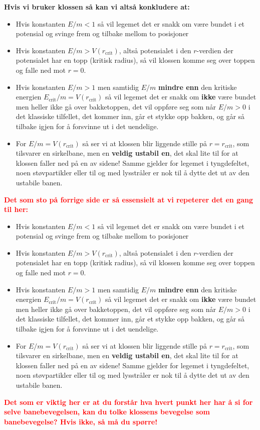 \documentclass{beamer}
\newcommand{\pagebutton}[1]{\setbeamertemplate{button}{\tikz\node[inner xsep = 5pt, draw = structure!90, fill = green(ryb), rounded corners = 8pt]{\color{amber}\Large\insertbuttontext};}\beamerbutton{#1}}
\begin{document}
\begin{frame}
{
{\bf Hvis vi bruker klossen så kan vi altså konkludere at:}
\begin{itemize}
\item Hvis konstanten $E/m<1$ så vil legemet det er snakk om være bundet i et potensial og svinge frem og tilbake mellom to posisjoner
\item Hvis konstanten $E/m>V(r_\mathrm{crit})$, altså potensialet i den $r$-verdien der potensialet har en topp (kritisk radius), så vil klossen komme seg over toppen og falle ned mot $r=0$.
\item Hvis konstanten $E/m>1$ men samtidig $E/m$ {\bf mindre enn} den kritiske energien $E_\mathrm{crit}/m=V(r_\mathrm{crit})$ så vil legemet det er snakk om {\bf ikke} være bundet men heller ikke gå over bakketoppen, det vil oppføre seg som når $E/m>0$ i det klassiske tilfellet, det kommer inn, går et stykke opp bakken, og går så tilbake igjen for å forsvinne ut i det uendelige.
\item For $E/m=V(r_\mathrm{crit})$ så ser vi at klossen blir liggende stille på $r=r_\mathrm{crit}$, som tilsvarer en sirkelbane, men en {\bf veldig ustabil en}, det skal lite til for at klossen faller ned på en av sidene! Samme gjelder for legemet i tyngdefeltet, noen støvpartikler eller til og med lysstråler er nok til å dytte det ut av den ustabile banen.
\end{itemize}
\hyperlink{skra24}{\pagebutton{SIDE 56/70/84}}}


{
\textcolor{red}{\bf\large Det som sto på forrige side er så essensielt at vi repeterer det en gang til her:}
\begin{itemize}
\item Hvis konstanten $E/m<1$ så vil legemet det er snakk om være bundet i et potensial og svinge frem og tilbake mellom to posisjoner
\item Hvis konstanten $E/m>V(r_\mathrm{crit})$, altså potensialet i den $r$-verdien der potensialet har en topp (kritisk radius), så vil klossen komme seg over toppen og falle ned mot $r=0$.
\item Hvis konstanten $E/m>1$ men samtidig $E/m$ {\bf mindre enn} den kritiske energien $E_\mathrm{crit}/m=V(r_\mathrm{crit})$ så vil legemet det er snakk om {\bf ikke} være bundet men heller ikke gå over bakketoppen, det vil oppføre seg som når $E/m>0$ i det klassiske tilfellet, det kommer inn, går et stykke opp bakken, og går så tilbake igjen for å forsvinne ut i det uendelige.
\item For $E/m=V(r_\mathrm{crit})$ så ser vi at klossen blir liggende stille på $r=r_\mathrm{crit}$, som tilsvarer en sirkelbane, men en {\bf veldig ustabil en}, det skal lite til for at klossen faller ned på en av sidene! Samme gjelder for legemet i tyngdefeltet, noen støvpartikler eller til og med lysstråler er nok til å dytte det ut av den ustabile banen.
\end{itemize}
\textcolor{red}{\bf\large Det som er viktig her er at du forstår hva hvert punkt her har å si for selve banebevegelsen, kan du tolke klossens bevegelse som banebevegelse? Hvis ikke, så må du spørre!}
\hyperlink{skra24b}{\pagebutton{SIDE 57/70/84}}}



\end{frame}
\end{document}
